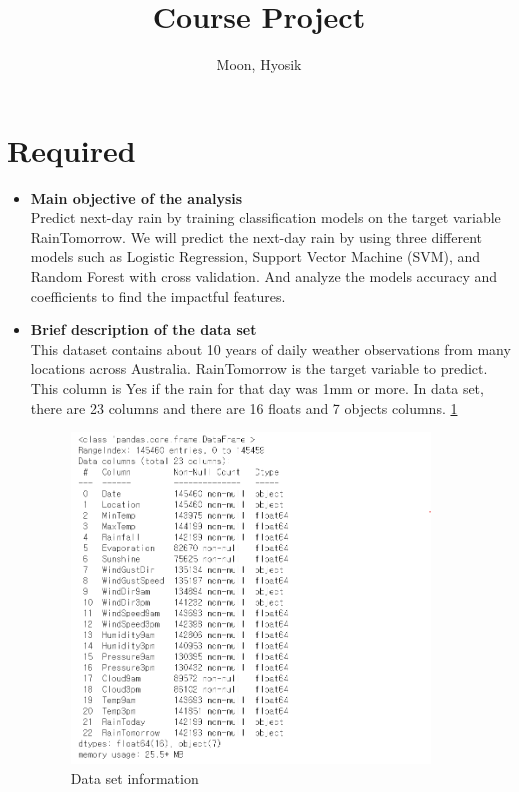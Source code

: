\documentclass[12pt]{article}
\title{Course Project}
\author{
  Moon, Hyosik
  }
\begin{document}
\maketitle

\section{Required}

\begin{itemize}
\item \textbf{Main objective of the analysis} \\
Predict next-day rain by training classification models on the target variable RainTomorrow. We will predict the next-day rain by using three different models such as Logistic Regression, Support Vector Machine (SVM), and Random Forest with cross validation. And analyze the models accuracy and coefficients to find the impactful features.

\item \textbf{Brief description of the data set} \\
This dataset contains about 10 years of daily weather observations from many locations across Australia. RainTomorrow is the target variable to predict. This column is Yes if the rain for that day was 1mm or more. In data set, there are 23 columns and there are 16 floats and 7 objects columns. \ref{data_info}

\begin{figure}[H]
    \centering
    \includegraphics[width=0.9\textwidth]{figures/data_info.png}
    \caption{Data set information}\label{data_info}
\end{figure}


\end{itemize}
\end{document}
